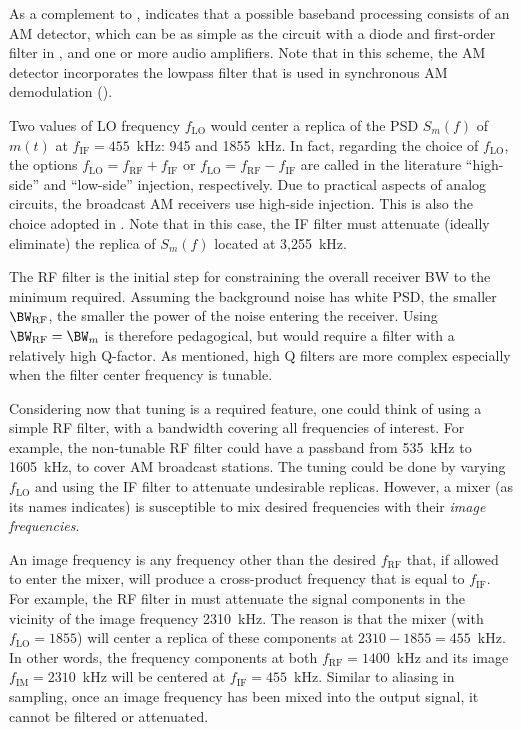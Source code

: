 As a complement to ,  indicates that a possible  baseband processing consists of an AM detector, which can be as simple as the circuit with a diode and first-order filter in , and one or more audio amplifiers. Note that in this scheme, the AM detector incorporates the lowpass filter that is used in synchronous AM demodulation ().

Two values of LO frequency $f_{\textrm{LO}}$ would center a replica of the PSD $S_m(f)$ of $m(t)$ at $f_{\textrm{IF}}=455$~kHz: 945 and 1855~kHz.
In fact, regarding the choice of $f_{\textrm{LO}}$, the options $f_{\textrm{LO}}=f_{\textrm{RF}}+f_{\textrm{IF}}$ or $f_{\textrm{LO}}=f_{\textrm{RF}}-f_{\textrm{IF}}$ are called in the literature ``high-side'' and ``low-side'' injection, respectively. Due to practical aspects of analog circuits, the broadcast AM receivers use high-side injection. This is also the choice adopted in . Note that in this case, the IF filter must attenuate (ideally eliminate) the replica of $S_m(f)$ located at 3,255~kHz.

The RF filter is the initial step for constraining the overall receiver 
BW to the minimum required. Assuming the background noise has white PSD, the smaller $\BW_{\textrm{RF}}$, the smaller the power of the noise entering the receiver. Using $\BW_{\textrm{RF}}=\BW_m$ is therefore pedagogical, but would require a filter with a relatively high Q-factor. As mentioned, high Q filters are more complex especially when the filter center frequency is tunable.

Considering now that tuning is a required feature, one could think of using a simple RF filter, with a bandwidth covering all frequencies of interest. For example, the non-tunable RF filter could have a passband from 535~kHz to 1605~kHz, to cover AM broadcast stations.
The tuning could be done by varying $f_{\textrm{LO}}$ and using the IF filter to attenuate undesirable replicas.
However, a mixer (as its names indicates) is susceptible to mix desired frequencies with their \emph{image frequencies}.

An image frequency is any frequency other than the desired $f_{\textrm{RF}}$ that, if allowed to enter the mixer, will produce a cross-product frequency that is equal to $f_{\textrm{IF}}$. For example, the RF filter in  must attenuate the signal components in the vicinity of the image frequency 2310~kHz. The reason is that the mixer (with $f_{\textrm{LO}}=1855$) will center a replica of these components at $2310-1855=455$~kHz. In other words, the frequency components at both $f_{\textrm{RF}}=1400$~kHz and its image $f_{\textrm{IM}}=2310$~kHz will be centered at $f_{\textrm{IF}}=455$~kHz. Similar to aliasing in sampling, once an image frequency has been mixed into the output signal, it cannot be filtered or attenuated.

